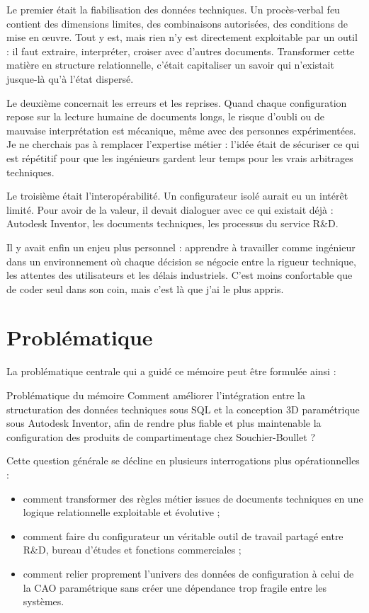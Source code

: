 Le premier était la fiabilisation des données techniques. Un procès-verbal feu contient des dimensions limites, des combinaisons autorisées, des conditions de mise en \oe uvre. Tout y est, mais rien n'y est directement exploitable par un outil : il faut extraire, interpréter, croiser avec d'autres documents. Transformer cette matière en structure relationnelle, c'était capitaliser un savoir qui n'existait jusque-là qu'à l'état dispersé.

Le deuxième concernait les erreurs et les reprises. Quand chaque configuration repose sur la lecture humaine de documents longs, le risque d'oubli ou de mauvaise interprétation est mécanique, même avec des personnes expérimentées. Je ne cherchais pas à remplacer l'expertise métier : l'idée était de sécuriser ce qui est répétitif pour que les ingénieurs gardent leur temps pour les vrais arbitrages techniques.

Le troisième était l'interopérabilité. Un configurateur isolé aurait eu un intérêt limité. Pour avoir de la valeur, il devait dialoguer avec ce qui existait déjà : Autodesk Inventor, les documents techniques, les processus du service R\&D.

Il y avait enfin un enjeu plus personnel : apprendre à travailler comme ingénieur dans un environnement où chaque décision se négocie entre la rigueur technique, les attentes des utilisateurs et les délais industriels. C'est moins confortable que de coder seul dans son coin, mais c'est là que j'ai le plus appris.

\section{Problématique}

La problématique centrale qui a guidé ce mémoire peut être formulée ainsi :

\begin{encadretitre}{Problématique du mémoire}
\large
Comment améliorer l'intégration entre la structuration des données techniques sous SQL et la conception 3D paramétrique sous Autodesk Inventor, afin de rendre plus fiable et plus maintenable la configuration des produits de compartimentage chez Souchier-Boullet ?
\end{encadretitre}

Cette question générale se décline en plusieurs interrogations plus opérationnelles :

\begin{itemize}[leftmargin=1.4cm]
\item comment transformer des règles métier issues de documents techniques en une logique relationnelle exploitable et évolutive ;
\item comment faire du configurateur un véritable outil de travail partagé entre R\&D, bureau d'études et fonctions commerciales ;
\item comment relier proprement l'univers des données de configuration à celui de la CAO paramétrique sans créer une dépendance trop fragile entre les systèmes.
\end{itemize}

